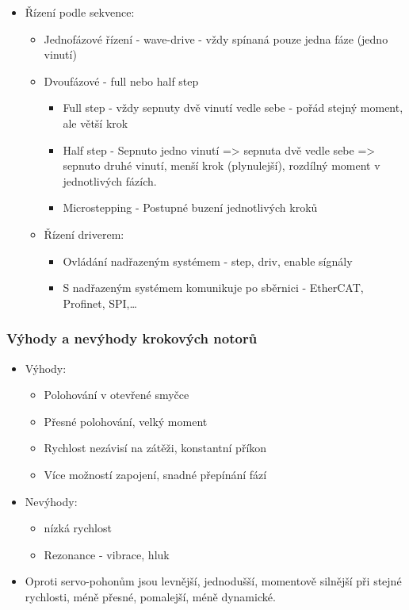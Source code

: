 \begin{itemize}
    \item Řízení podle sekvence: \begin{itemize}
              \item Jednofázové řízení - wave-drive - vždy spínaná pouze jedna fáze (jedno vinutí)
              \item Dvoufázové - full nebo half step\begin{itemize}
                        \item Full step - vždy sepnuty dvě vinutí vedle sebe - pořád stejný moment, ale větší krok
                        \item Half step - Sepnuto jedno vinutí => sepnuta dvě vedle sebe => sepnuto druhé vinutí, menší krok (plynulejší), rozdílný moment v jednotlivých fázích.
                        \item Microstepping - Postupné buzení jednotlivých kroků
                    \end{itemize}
              \item Řízení driverem: \begin{itemize}
                        \item Ovládání nadřazeným systémem - step, driv, enable sígnály
                        \item S nadřazeným systémem komunikuje po sběrnici - EtherCAT, Profinet, SPI,\dots
                    \end{itemize}
          \end{itemize}
\end{itemize}

\subsubsection*{Výhody a nevýhody krokových notorů}
\begin{itemize}
    \item Výhody: \begin{itemize}
              \item Polohování v otevřené smyčce
              \item Přesné polohování, velký moment
              \item Rychlost nezávisí na zátěži, konstantní příkon
              \item Více možností zapojení, snadné přepínání fází
          \end{itemize}
    \item Nevýhody: \begin{itemize}
              \item nízká rychlost
              \item Rezonance - vibrace, hluk
          \end{itemize}
    \item Oproti servo-pohonům jsou levnější, jednodušší, momentově silnější při stejné rychlosti, méně přesné, pomalejší, méně dynamické.
\end{itemize}

